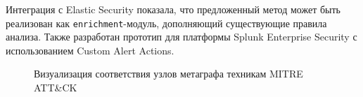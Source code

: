 Интеграция с Elastic Security показала, что предложенный метод может быть реализован как \texttt{enrichment}-модуль, дополняющий существующие правила анализа. Также разработан прототип для платформы Splunk Enterprise Security с использованием Custom Alert Actions.

\FloatBarrier
\begin{figure}[ht]
\centering
\resizebox{0.85\textwidth}{!}{}
\caption{Визуализация соответствия узлов метаграфа техникам MITRE ATT\&CK}
\end{figure}
